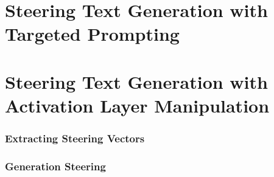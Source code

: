 \section{Steering Text Generation with Targeted Prompting}
\label{sec:approach:steering:targeted}


\section{Steering Text Generation with Activation Layer Manipulation}
\label{sec:approach:steering:actAdd}

\subsubsection{Extracting Steering Vectors}

\subsubsection{Generation Steering}